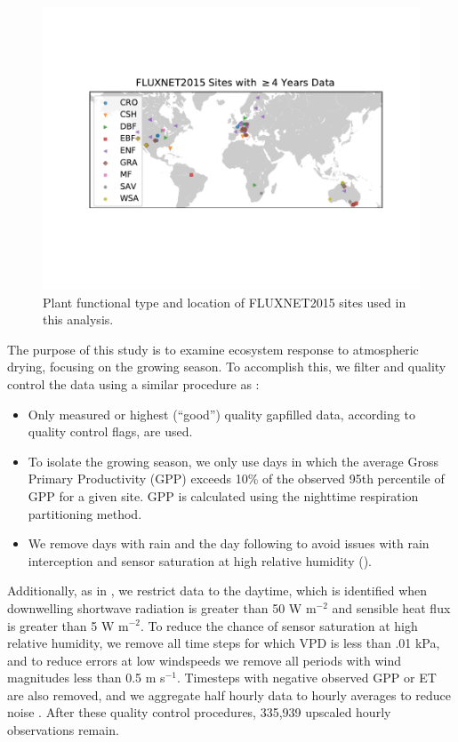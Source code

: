 \documentclass[draft,linenumbers]{agujournal}
\begin{document}
\begin{figure}
\centering
\includegraphics[width=\textwidth]{./map.pdf}
\caption{Plant functional type and location of FLUXNET2015 sites used in this analysis.}
\label{map_fig}
 \end{figure}


The purpose of this study is to examine ecosystem response to atmospheric drying, focusing on the growing season. To accomplish this, we filter and quality control the data using a similar procedure as \cite{Zhou_2015}:
\begin{itemize}
\item Only measured or highest (``good'') quality gapfilled data, according to quality control flags, are used.
\item To isolate the growing season, we only use days in which the average Gross Primary Productivity (GPP) exceeds 10\% of the observed 95th percentile of GPP for a given site. GPP is calculated using the nighttime respiration partitioning method.
\item We remove days with rain and the day following to avoid issues with rain interception and sensor saturation at high relative humidity (\cite{MEDLYN_2011}).
\end{itemize}
Additionally, as in \citet{Lin_2018}, we restrict data to the daytime, which is identified when downwelling shortwave radiation is greater than 50 W m$^{-2}$ and sensible heat flux is greater than 5 W m$^{-2}$. To reduce the chance of sensor saturation at high relative humidity, we remove all time steps for which VPD is less than .01 kPa, and to reduce errors at low windspeeds we remove all periods with wind magnitudes less than 0.5 m s$^{-1}$. Timesteps with negative observed GPP or ET are also removed, and we aggregate half hourly data to hourly averages to reduce noise \citep{Lin_2018}. After these quality control procedures, 335,939 upscaled hourly observations remain. 
\end{document}
